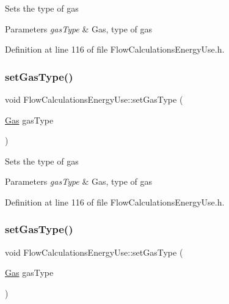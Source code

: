 Sets the type of gas


\begin{DoxyParams}{Parameters}
{\em gas\+Type} & Gas, type of gas \\
\hline
\end{DoxyParams}


Definition at line 116 of file Flow\+Calculations\+Energy\+Use.\+h.

\mbox{\label{class_flow_calculations_energy_use_a01b38762426c50e6ab22aefd674f30df}} 
\subsubsection{\texorpdfstring{set\+Gas\+Type()}{setGasType()}\hspace{0.1cm}{\footnotesize\ttfamily [2/3]}}
{\footnotesize\ttfamily void Flow\+Calculations\+Energy\+Use\+::set\+Gas\+Type (\begin{DoxyParamCaption}\item[{\hyperlink{class_flow_calculations_energy_use_a840d5a836e7b05d6791b79bace4440f2}{Gas}}]{gas\+Type }\end{DoxyParamCaption})\hspace{0.3cm}{\ttfamily [inline]}}

Sets the type of gas


\begin{DoxyParams}{Parameters}
{\em gas\+Type} & Gas, type of gas \\
\hline
\end{DoxyParams}


Definition at line 116 of file Flow\+Calculations\+Energy\+Use.\+h.

\mbox{\label{class_flow_calculations_energy_use_a01b38762426c50e6ab22aefd674f30df}} 
\subsubsection{\texorpdfstring{set\+Gas\+Type()}{setGasType()}\hspace{0.1cm}{\footnotesize\ttfamily [3/3]}}
{\footnotesize\ttfamily void Flow\+Calculations\+Energy\+Use\+::set\+Gas\+Type (\begin{DoxyParamCaption}\item[{\hyperlink{class_flow_calculations_energy_use_a840d5a836e7b05d6791b79bace4440f2}{Gas}}]{gas\+Type }\end{DoxyParamCaption})\hspace{0.3cm}{\ttfamily [inline]}}

